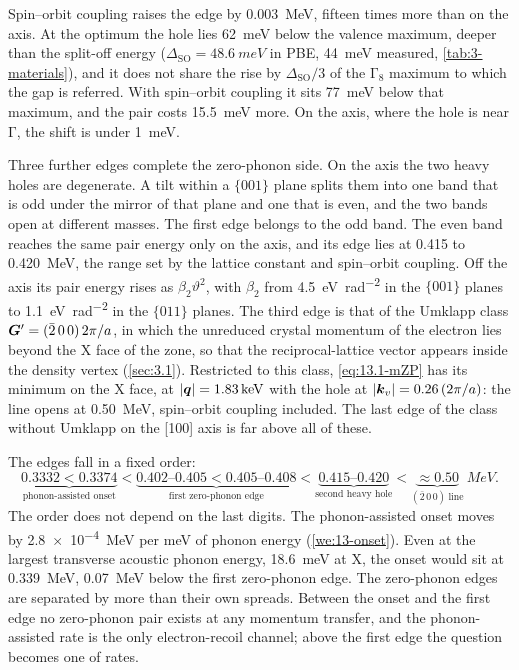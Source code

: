 Spin--orbit coupling raises the edge by \SI{0.003}{MeV}, fifteen times more than on the axis. At the optimum the hole lies \SI{62}{meV} below the valence maximum, deeper than the split-off energy ($\Delta_{\mathrm{SO}} = \SI{48.6}{meV}$ in PBE, \SI{44}{meV} measured, \cref{tab:3-materials}), and it does not share the rise by $\Delta_{\mathrm{SO}}/3$ of the $\mathrm{\Gamma}_8$ maximum to which the gap is referred. With spin--orbit coupling it sits \SI{77}{meV} below that maximum, and the pair costs \SI{15.5}{meV} more. On the axis, where the hole is near $\mathrm{\Gamma}$, the shift is under \SI{1}{meV}.

Three further edges complete the zero-phonon side. On the axis the two heavy holes are degenerate. A tilt within a $\{001\}$ plane splits them into one band that is odd under the mirror of that plane and one that is even, and the two bands open at different masses. The first edge belongs to the odd band. The even band reaches the same pair energy only on the axis, and its edge lies at 0.415 to \SI{0.420}{MeV}, the range set by the lattice constant and spin--orbit coupling. Off the axis its pair energy rises as $\beta_2\vartheta^2$, with $\beta_2$ from \SI{4.5}{eV.rad^{-2}} in the $\{001\}$ planes to \SI{1.1}{eV.rad^{-2}} in the $\{011\}$ planes. The third edge is that of the Umklapp class $\bm{G}' = (\bar2\,0\,0)\,2\pi/a$, in which the unreduced crystal momentum of the electron lies beyond the X face of the zone, so that the reciprocal-lattice vector appears inside the density vertex (\cref{sec:3.1}). Restricted to this class, \cref{eq:13.1-mZP} has its minimum on the X face, at $|\bm{q}| = \SI{1.83}{keV}$ with the hole at $|\bm{k}_v| = 0.26\,(2\pi/a)$: the line opens at \SI{0.50}{MeV}, spin--orbit coupling included. The last edge of the class without Umklapp on the [100] axis is far above all of these.

The edges fall in a fixed order:
\begin{equation*}
  \underbrace{0.3332 < 0.3374}_{\text{phonon-assisted onset}}
  < \underbrace{0.402\text{--}0.405 < 0.405\text{--}0.408}_{\text{first zero-phonon edge}}
  < \underbrace{0.415\text{--}0.420}_{\text{second heavy hole}}
  < \underbrace{\approx 0.50}_{(\bar2\,0\,0)\ \text{line}}\ \si{MeV} .
\end{equation*}
The order does not depend on the last digits. The phonon-assisted onset moves by \SI{2.8e-4}{MeV} per meV of phonon energy (\cref{we:13-onset}). Even at the largest transverse acoustic phonon energy, \SI{18.6}{meV} at X, the onset would sit at \SI{0.339}{MeV}, \SI{0.07}{MeV} below the first zero-phonon edge. The zero-phonon edges are separated by more than their own spreads. Between the onset and the first edge no zero-phonon pair exists at any momentum transfer, and the phonon-assisted rate is the only electron-recoil channel; above the first edge the question becomes one of rates.



